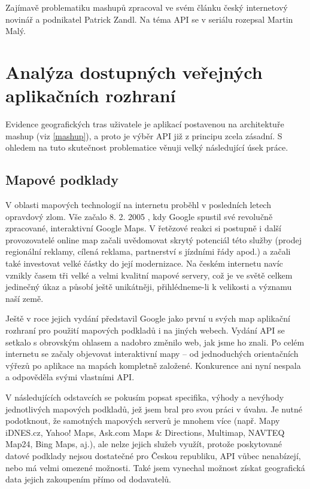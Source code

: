 Zajímavě problematiku mashupů zpracoval ve svém článku
\cite{certodejMashup} český internetový novinář a podnikatel Patrick
Zandl. Na téma API se v seriálu \cite{misantropApi} rozepsal Martin
Malý.

\chapter{Analýza dostupných veřejných aplikačních rozhraní}

Evidence geografických tras uživatele je aplikací postavenou na
architektuře mashup (viz \ref{mashup}), a proto je výběr API již z
principu zcela zásadní. S ohledem na tuto skutečnost problematice
věnuji velký následující úsek práce.

\section{Mapové podklady}\label{vybermap}
V oblasti mapových technologií na internetu proběhl v
posledních letech opravdový zlom. Vše začalo 8. 2.
2005 \cite{gmaps}, kdy Google spustil své revolučně zpracované,
interaktivní Google Maps. V řetězové reakci si postupně i další
provozovatelé online map začali uvědomovat skrytý potenciál této
služby (prodej regionální reklamy, cílená reklama, partnerství s
jízdními řády apod.) a začali také investovat velké částky do její
modernizace. Na českém internetu navíc vznikly časem tři velké a
velmi kvalitní mapové servery, což je ve světě celkem jedinečný úkaz
a působí ještě unikátněji, přihlédneme-li k velikosti a významu naší
země.

Ještě v roce jejich vydání představil Google jako první u svých
map aplikační rozhraní pro použití mapových podkladů i na jiných
webech. Vydání API se setkalo s obrovským ohlasem \cite{gmapsSuccess}
a nadobro změnilo web, jak jsme ho znali. Po celém internetu se začaly objevovat
interaktivní mapy -- od jednoduchých orientačních výřezů po aplikace
na mapách kompletně založené. Konkurence ani nyní nespala a odpověděla
svými vlastními API.

V následujících odstavcích se pokusím popsat specifika, výhody a
nevýhody jednotlivých mapových podkladů, jež jsem bral pro svou práci
v úvahu. Je nutné podotknout, že samotných mapových serverů je mnohem
více (např. Mapy iDNES.cz, Yahoo! Maps, Ask.com Maps \& Directions,
Multimap, NAVTEQ Map24, Bing Maps, aj.), ale nelze jejich služeb využít,
protože poskytované datové podklady nejsou dostatečné pro Českou
republiku, API vůbec nenabízejí, nebo má velmi omezené možnosti. Také
jsem vynechal možnost získat geografická data jejich zakoupením přímo od dodavatelů.

